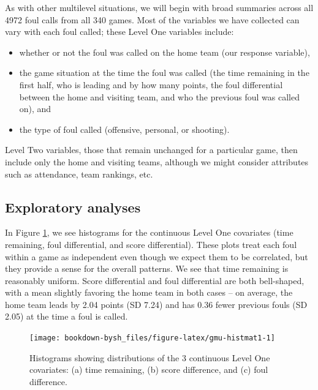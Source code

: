\documentclass[
]{krantz}
\providecommand{\tightlist}{%
  \setlength{\itemsep}{0pt}\setlength{\parskip}{0pt}}
\begin{document}
As with other multilevel situations, we will begin with broad summaries across all 4972 foul calls from all 340 games. Most of the variables we have collected can vary with each foul called; these Level One variables include:

\begin{itemize}
\tightlist
\item
  whether or not the foul was called on the home team (our response variable),
\item
  the game situation at the time the foul was called (the time remaining in the first half, who is leading and by how many points, the foul differential between the home and visiting team, and who the previous foul was called on), and
\item
  the type of foul called (offensive, personal, or shooting).
\end{itemize}

Level Two variables, those that remain unchanged for a particular game, then include only the home and visiting teams, although we might consider attributes such as attendance, team rankings, etc.

\hypertarget{glmm-eda}{%
\subsection{Exploratory analyses}\label{glmm-eda}}

In Figure \ref{fig:gmu-histmat1}, we see histograms for the continuous Level One covariates (time remaining, foul differential, and score differential). These plots treat each foul within a game as independent even though we expect them to be correlated, but they provide a sense for the overall patterns. We see that time remaining is reasonably uniform. Score differential and foul differential are both bell-shaped, with a mean slightly favoring the home team in both cases -- on average, the home team leads by 2.04 points (SD 7.24) and has 0.36 fewer previous fouls (SD 2.05) at the time a foul is called.

\begin{figure}

{\centering \texttt{[image: bookdown-bysh\_files/figure-latex/gmu-histmat1-1]} 

}

\caption{Histograms showing distributions of the 3 continuous Level One covariates: (a) time remaining, (b) score difference, and (c) foul difference.}\label{fig:gmu-histmat1}
\end{figure}
\end{document}
